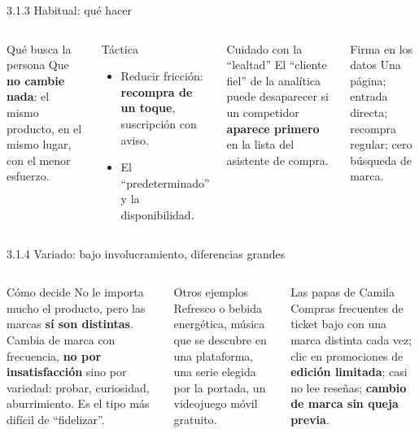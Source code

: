 \documentclass[aspectratio=169,xcolor=dvipsnames]{beamer}
\begin{document}
\begin{frame}{3.1.3 Habitual: qué hacer}
\begin{columns}[T]
  \begin{block}{Qué busca la persona}
    \small Que \textbf{no cambie nada}: el mismo producto, en el mismo lugar, con el menor esfuerzo.
  \end{block}
  \begin{block}{Táctica}
    \small
    \begin{itemize}
      \item Reducir fricción: \textbf{recompra de un toque}, suscripción con aviso.
      \item El \enquote{predeterminado} y la disponibilidad.
    \end{itemize}
  \end{block}
  \begin{alertblock}{Cuidado con la \enquote{lealtad}}
    \small El \enquote{cliente fiel} de la analítica puede desaparecer si un competidor \textbf{aparece primero} en la lista del asistente de compra.
  \end{alertblock}
  \begin{exampleblock}{Firma en los datos}
    \small Una página; entrada directa; recompra regular; cero búsqueda de marca.
  \end{exampleblock}
\end{columns}
\end{frame}

\begin{frame}{3.1.4 Variado: bajo involucramiento, diferencias grandes}
\begin{columns}[T]
  \begin{block}{Cómo decide}
    \small No le importa mucho el producto, pero las marcas \textbf{sí son distintas}. Cambia de marca con frecuencia, \textbf{no por insatisfacción} sino por variedad: probar, curiosidad, aburrimiento. Es el tipo más difícil de \enquote{fidelizar}.
  \end{block}
  \begin{block}{Otros ejemplos}
    \small Refresco o bebida energética, música que se descubre en una plataforma, una serie elegida por la portada, un videojuego móvil gratuito.
  \end{block}
  \begin{exampleblock}{Las papas de Camila}
    \small Compras frecuentes de ticket bajo con una marca distinta cada vez; clic en promociones de \textbf{edición limitada}; casi no lee reseñas; \textbf{cambio de marca sin queja previa}.
  \end{exampleblock}
\end{columns}
\end{frame}
\end{document}
